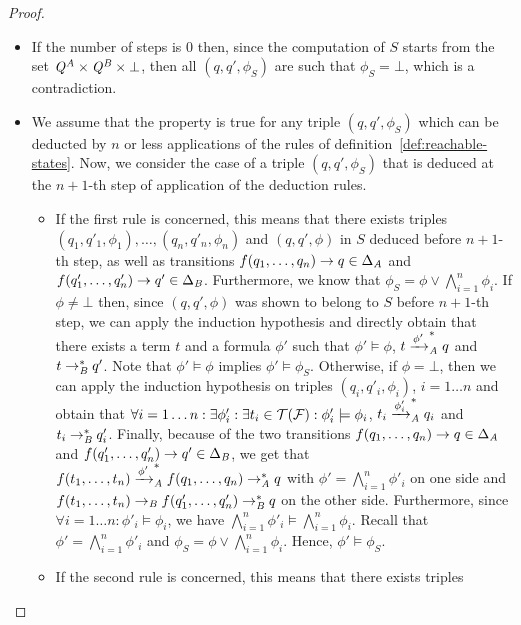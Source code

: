 \begin{proof}
\begin{itemize}
\item If the number of steps is $0$ then, since the computation of $S$ starts
  from the set $\mathit Q^\mathit A \times \mathit Q^\mathit B \times \bot$, then all $(q,q',\phi_S)$
  are such that $\phi_S=\bot$, which is a contradiction.


\item We assume that the property is true for any triple $(q,q',\phi_S)$ which can
  be deducted by $n$ or less applications of the rules of
  definition~\ref{def:reachable-states}. Now, we consider the case of a triple
  $(q,q',\phi_S)$ that is deduced at the $n+1$-th step of application of the
  deduction rules.
  \begin{itemize}
  \item If the first rule is concerned, this means that there exists triples
    $(q_1,q'_1, \phi_1),\ldots,(q_n,q'_n,\phi_n)$ and $(q,q',\phi)$ in $S$
    deduced before $n+1$-th step, as well as transitions $f(q_1,\ldots,q_n)\rightarrow q
    \in \Delta_\mathit A$ and $f(q'_1,\ldots,q'_n)\rightarrow q' \in \Delta_\mathit B$. Furthermore,
    we know that $\phi_S=\phi \vee \bigwedge_{i=1}^n \phi_i$.
    If $\phi\neq \bot$ then, since $(q,q',\phi)$ was shown to belong to $S$
    before $n+1$-th step, we can apply the induction hypothesis and directly
    obtain that there exists a term $t$ and a formula $\phi'$ such that $\phi'
    \models \phi$, $t \xrightarrow{\phi'}^*_\mathit A q$ and $t \rightarrow_\mathit B^* q'$. Note that $\phi'
    \models \phi$ implies $\phi' \models \phi_S$.
    Otherwise, if $\phi=\bot$, then %
    we can apply the induction hypothesis on triples $(q_i,q'_i,\phi_i)$,
    $i=1\ldots n$ and obtain that $\forall i=1\ldots n:\exists \phi_i':\exists
    t_i \in\mathcal{T(F)}: \phi'_i \models \phi_i$, $t_i \xrightarrow{\phi_i'}_\mathit A^* q_i$ and $t_i
    \rightarrow_\mathit B^* q'_i$. Finally, 
    because of the two transitions $f(q_1,\ldots,q_n)\rightarrow q \in \Delta_\mathit A$ and
    $f(q'_1,\ldots,q'_n)\rightarrow q' \in \Delta_\mathit B$, we get that $f(t_1,\ldots,t_n)
    \xrightarrow{\phi'}_\mathit A^* f(q_1,\ldots,q_n) \rightarrow_\mathit A^* q$ with
    $\phi'=\bigwedge_{i=1}^n \phi'_i$ on one side and $f(t_1,\ldots,t_n) 
    \rightarrow_\mathit B f(q'_1,\ldots,q'_n) \rightarrow_\mathit B^* q$ on the other side. Furthermore,
    since $\forall i=1\ldots n: \phi'_i \models \phi_i$, we have
    $\bigwedge_{i=1}^n \phi'_i \models \bigwedge_{i=1}^n \phi_i$. Recall that
    $\phi'= \bigwedge_{i=1}^n \phi'_i$ and $\phi_S= \phi\vee \bigwedge_{i=1}^n
    \phi_i$. Hence, $\phi' \models \phi_S$.
  \item If the second rule is concerned, this means that there exists triples

\end{itemize}
\end{itemize}
\end{proof}
